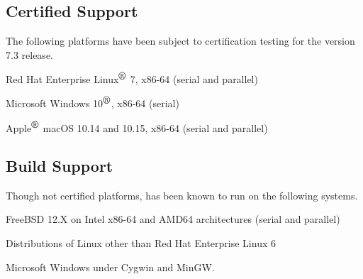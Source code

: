 \documentclass[letterpaper]{scrartcl}
\begin{document}
\subsection*{Certified Support}
The following platforms have been subject to certification testing for the
\Xyce{} version 7.3 release.
\begin{XyceItemize}
  \item Red Hat Enterprise Linux${}^{\mbox{\textregistered}}$ 7, x86-64 (serial and parallel)
  \item Microsoft Windows 10${}^{\mbox{\textregistered}}$, x86-64 (serial)
  \item Apple${}^{\mbox{\textregistered}}$ macOS 10.14 and 10.15, x86-64 (serial and parallel)
\end{XyceItemize}


\subsection*{Build Support}
Though not certified platforms, \Xyce{} has been known to run on the following
systems.
\begin{XyceItemize}
  \item FreeBSD 12.X on Intel x86-64 and AMD64 architectures (serial
    and parallel)
  \item Distributions of Linux other than Red Hat Enterprise Linux 6
  \item Microsoft Windows under Cygwin and MinGW.
\end{XyceItemize}
\end{document}
